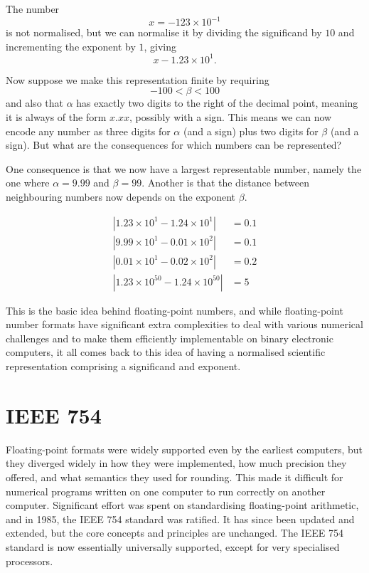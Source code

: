 \begin{example}
  The number
  \[
    x = -123 \times 10^{-1}
  \]
  is not normalised, but we can normalise it by dividing the significand
  by $10$ and incrementing the exponent by $1$, giving
  \[
    x -1.23 \times 10^{1}.
  \]
\end{example}

Now suppose we make this representation finite by requiring
\[
  -100 < \beta < 100
\]
and also that $\alpha$ has exactly two digits to the right of the
decimal point, meaning it is always of the form $x.xx$, possibly with
a sign.  This means we can now encode any number as three digits for
$\alpha$ (and a sign) plus two digits for $\beta$ (and a sign).  But
what are the consequences for which numbers can be represented?

One consequence is that we now have a largest representable number,
namely the one where $\alpha=9.99$ and $\beta=99$.  Another is that
the distance between neighbouring numbers now depends on the exponent
$\beta$.
\begin{example}
\begin{align}
  |1.23\times 10^{1} - 1.24\times 10^{1}| &= 0.1 \\
  |9.99\times 10^{1} - 0.01\times 10^{2}| &= 0.1 \\
  |0.01\times 10^{1} - 0.02\times 10^{2}| &= 0.2 \\
  |1.23\times 10^{50} - 1.24\times 10^{50}| &= 5
\end{align}
\end{example}

This is the basic idea behind floating-point numbers, and while
floating-point number formats have significant extra complexities to
deal with various numerical challenges and to make them efficiently
implementable on binary electronic computers, it all comes back to
this idea of having a normalised scientific representation comprising
a significand and exponent.

\section{IEEE 754}

Floating-point formats were widely supported even by the earliest
computers, but they diverged widely in how they were implemented, how
much precision they offered, and what semantics they used for
rounding.  This made it difficult for numerical programs written on
one computer to run correctly on another computer.  Significant effort
was spent on standardising floating-point arithmetic, and in 1985, the
IEEE 754 standard was ratified.  It has since been updated and
extended, but the core concepts and principles are unchanged.  The
IEEE 754 standard is now essentially universally supported, except for
very specialised processors.

